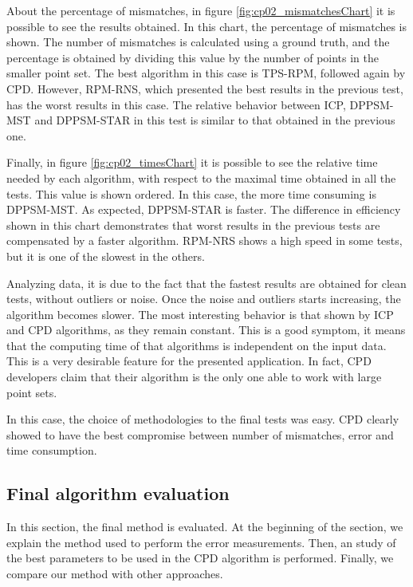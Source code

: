 About the percentage of mismatches, in figure \ref{fig:cp02_mismatchesChart} it is possible to see the results obtained. In 
this chart, the percentage of mismatches is shown. The number of mismatches is calculated using a ground truth, and the 
percentage is obtained by dividing this value by the number of points in the smaller point set. The best algorithm in 
this case is TPS-RPM, followed again by CPD. However, RPM-RNS, which presented the best results in the previous test, 
has the worst results in this case. The relative behavior between ICP, DPPSM-MST and DPPSM-STAR in this test is 
similar to that obtained in the previous one.

Finally, in figure \ref{fig:cp02_timesChart} it is possible to see the relative time needed by each algorithm, with respect to 
the maximal time obtained in all the tests. This value is shown ordered. In this case, the more time consuming is 
DPPSM-MST. As expected, DPPSM-STAR is faster. The difference in efficiency shown in this chart demonstrates that worst 
results in the previous tests are compensated by a faster algorithm. RPM-NRS shows a high speed in some tests, but it is 
one of the slowest in the others. 

Analyzing data, it is due to the fact that the fastest results are obtained for clean 
tests, without outliers or noise. Once the noise and outliers starts increasing, the algorithm becomes slower.
The most interesting behavior is that shown by ICP and CPD algorithms, as they remain constant. This is a good 
symptom, it means that the computing time of that algorithms is independent on the input data. This is a very desirable 
feature for the presented application. In fact, CPD developers \cite{myronenko2010point} claim that their algorithm is 
the only one able to work with large point sets.

In this case, the choice of methodologies to the final tests was easy. CPD clearly showed to have the best compromise 
between number of mismatches, error and time consumption.

\subsection{Final algorithm evaluation}\label{ch:chapter02_02_03}

In this section, the final method is evaluated. At the beginning of the section, we explain the method used to perform the error measurements. Then, an study of the best parameters to be used in the CPD algorithm is performed. Finally, we compare our method with other approaches.

